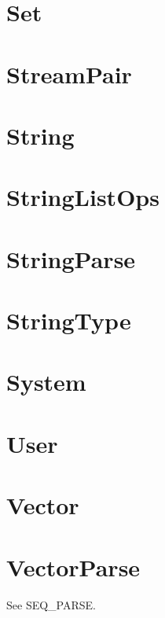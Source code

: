 \newpage
\section{Set}


\newpage
\section{StreamPair}


\newpage
\section{String}


\newpage
\section{StringListOps}


\newpage
\section{StringParse}


\newpage
\section{StringType}


\newpage
\section{System}


\newpage
\section{User}


\newpage
\section{Vector}


\newpage
\section{VectorParse}
See SEQ\_PARSE.





